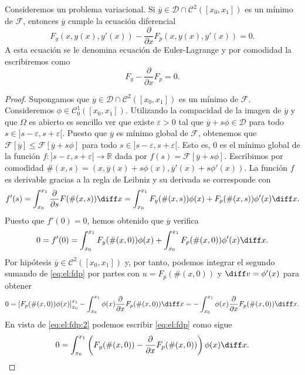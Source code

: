 \documentclass{article}
\begin{document}
\begin{thm} \label{thm:el} Consideremos un problema variacional. Si
  $\overline{y} \in \mathcal{D} \cap \mathcal{C}^2([x_0, x_1])$ es un mínimo de $\mathcal{F}$,
  entonces $\overline{y}$ cumple la ecuación diferencial
  \[F_y(x, y(x), y'(x)) - \frac{\partial}{\partial x} F_p(x, y(x), y'(x)) = 0.\] A esta ecuación se
  le denomina ecuación de Euler-Lagrange y por comodidad la escribiremos como
  \[F_y - \frac{\partial}{\partial x} F_p = 0.\]
\end{thm}
\begin{proof}
  Supongamos que $\overline{y} \in \mathcal{D} \cap \mathcal{C}^2([x_0, x_1])$ es un mínimo de
  $\mathcal{F}$. Consideremos $\phi \in \mathcal{C}^1_0([x_0, x_1])$. Utilizando la compacidad de la
  imagen de $\overline{y}$ y que $\Omega$ es abierto es sencillo ver que existe $\varepsilon > 0$
  tal que $\overline{y} + s \phi \in \mathcal{D}$ para todo $s \in ]s-\varepsilon,
  s+\varepsilon[$. Puesto que $\overline{y}$ es mínimo global de $\mathcal{F}$, obtenemos que
  $\mathcal{F}[\overline{y}] \le \mathcal{F}[\overline{y} + s \phi]$ para todo
  $s \in ]s-\varepsilon, s+\varepsilon[$. Esto es, $0$ es el mínimo global de la función
  $f: ]s-\varepsilon, s+\varepsilon[ \to \mathbb{R}$ dada por
  $f(s) = \mathcal{F}[\overline{y} + s \phi]$. Escribimos por comodidad
  $\#(x, s) = (x, \overline{y}(x) + s \phi(x), \overline{y}'(x) + s \phi'(x))$. La función $f$ es
  derivable gracias a la regla de Leibniz y su derivada se corresponde con
  \[f'(s) = \int_{x_0}^{x_1} \frac{\partial}{\partial s} F(\#(x, s)) \diff x = \int_{x_0}^{x_1}
    F_y(\#(x, s)) \phi(x) + F_p(\#(x, s)) \phi'(x) \diff x.\] Puesto que $f'(0) = 0$, hemos obtenido
  que $\overline{y}$ verifica
  \begin{equation} \label{eq:el:fdp} 0 = f'(0) = \int_{x_0}^{x_1} F_y(\#(x, 0)) \phi(x) +
    \int_{x_0}^{x_1} F_p(\#(x, 0)) \phi'(x) \diff x.
  \end{equation}
  Por hipótesis $\overline{y} \in \mathcal{C}^2([x_0, x_1])$ y, por tanto, podemos integrar el
  segundo sumando de \eqref{eq:el:fdp} por partes con $u = F_p(\#(x, 0))$ y $\diff v = \phi'(x)$
  para obtener
  \begin{equation} \label{eq:el:fdp:2} 0 = \left[F_p(\#(x, 0)) \phi(x)\right]_{x_0}^{x_1} -
    \int_{x_0}^{x_1} \phi(x) \frac{\partial}{\partial x} F_p(\#(x, 0)) \diff x = - \int_{x_0}^{x_1}
    \phi(x) \frac{\partial}{\partial x} F_p(\#(x, 0)) \diff x.
  \end{equation}
  En vista de \eqref{eq:el:fdp:2} podemos escribir \eqref{eq:el:fdp} como sigue
  \begin{equation} \label{eq:el:fd} 0 = \int_{x_0}^{x_1} \left(F_y(\#(x, 0)) -
      \frac{\partial}{\partial x} F_p(\#(x, 0))\right) \phi(x) \diff x.
  \end{equation}
  

\end{proof}
\end{document}
